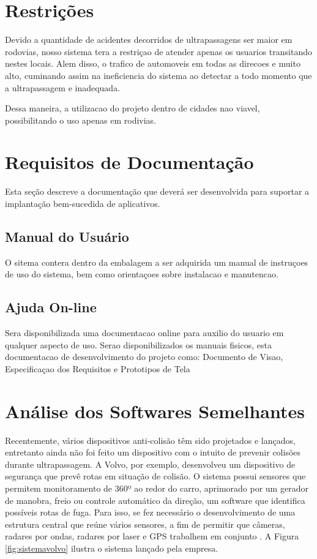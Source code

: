 \section{Restrições}
Devido a quantidade de acidentes decorridos de ultrapassagens ser maior em rodovias, nosso sistema tera a restriçao de atender apenas os usuarios transitando nestes locais. Alem disso, o trafico de automoveis em todas as direcoes e muito alto, cuminando assim na ineficiencia do sistema ao detectar a todo momento que a ultrapassagem e inadequada.

Dessa maneira, a utilizacao do projeto dentro de cidades nao viavel, possibilitando o uso apenas em rodivias.

\section{Requisitos de Documentação}
Esta seção descreve a documentação que deverá ser desenvolvida para suportar a implantação bem-sucedida de aplicativos.

\subsection{Manual do Usuário}
O sitema contera dentro da embalagem a ser adquirida um manual de instruçoes de uso do sistema, bem como orientaçoes sobre instalacao e manutencao.

\subsection{Ajuda On-line}
Sera disponibilizada uma documentacao online para auxilio do usuario em qualquer aspecto de uso. Serao disponibilizados os manuais fisicos, esta documentacao de desenvolvimento do projeto como: Documento de Visao, Especificaçao dos Requisitos e Prototipos de Tela

\section{Análise dos Softwares Semelhantes}
Recentemente, vários dispositivos anti-colisão têm sido projetados e lançados, entretanto ainda não foi feito um dispositivo com o intuito
de prevenir colisões durante ultrapassagem. A Volvo, por exemplo, desenvolveu um dispositivo de segurança que prevê rotas em situação de
colisão. O sistema possui sensores que permitem monitoramento de 360º ao redor do carro, aprimorado por um gerador de manobra, freio ou controle
automático da direção, um software que identifica possíveis rotas de fuga. Para isso, se fez necessário o desenvolvimento de uma estrutura central
que reúne vários sensores, a fim de permitir que câmeras, radares por ondas, radares por laser e GPS trabalhem em conjunto \cite{volvo}. A
 Figura \ref{fig:sistemavolvo} ilustra
 o sistema lançado pela empresa.

